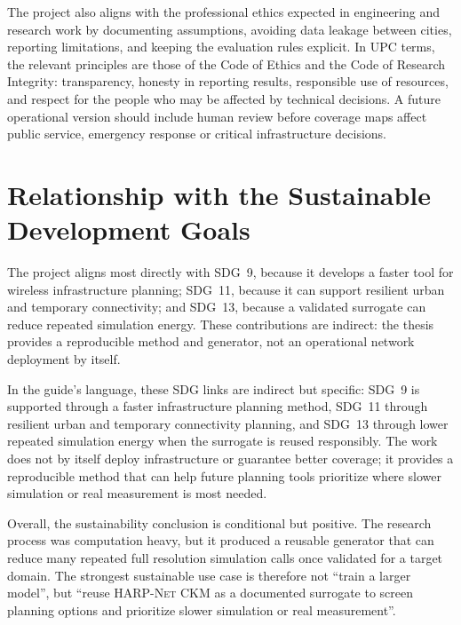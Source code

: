 The project also aligns with the professional ethics expected in engineering
and research work by documenting assumptions, avoiding data leakage between
cities, reporting limitations, and keeping the evaluation rules explicit.
In UPC terms, the relevant principles are those of the Code of Ethics and the
Code of Research Integrity: transparency, honesty in reporting results,
responsible use of resources, and respect for the people who may be affected by
technical decisions. A future operational version should include human review
before coverage maps affect public service, emergency response or critical
infrastructure decisions.

\section{Relationship with the Sustainable Development Goals}

The project aligns most directly with SDG~9, because it develops a faster tool
for wireless infrastructure planning; SDG~11, because it can support resilient
urban and temporary connectivity; and SDG~13, because a validated surrogate can
reduce repeated simulation energy. These contributions are indirect: the thesis
provides a reproducible method and generator, not an operational network
deployment by itself.

In the guide's language, these SDG links are indirect but specific:
SDG~9 is supported through a faster infrastructure planning method, SDG~11
through resilient urban and temporary connectivity planning, and SDG~13 through
lower repeated simulation energy when the surrogate is reused responsibly. The
work does not by itself deploy infrastructure or guarantee better coverage; it
provides a reproducible method that can help future planning tools prioritize
where slower simulation or real measurement is most needed.

Overall, the sustainability conclusion is conditional but positive. The research
process was computation heavy, but it produced a reusable generator that can
reduce many repeated full resolution simulation calls once validated for a
target domain. The strongest sustainable use case is therefore not ``train a
larger model'', but ``reuse \textsc{HARP-Net CKM} as a documented surrogate to screen
planning options and prioritize slower simulation or real measurement''.
